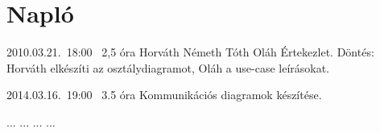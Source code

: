 %
\section{Napló}

\begin{naplo}

\bejegyzes
{2010.03.21.~18:00~} %
{2,5 óra} %
{Horváth\newline
Németh\newline
Tóth\newline
Oláh} %
{Értekezlet. Döntés: Horváth elkészíti az osztálydiagramot, Oláh a use-case leírásokat.} %

\bejegyzes
{2014.03.16.~19:00~}
{3.5 óra}
{\vadam}
{Kommunikációs diagramok készítése.}

\bejegyzes
{...}
{...}
{...}
{...}


\end{naplo}


